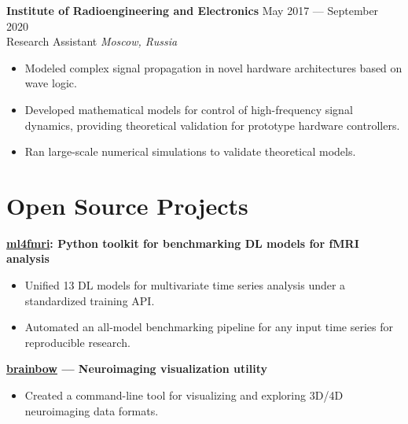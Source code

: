 \documentclass[11pt,a4paper]{article}
\begin{document}
\noindent\textbf{Institute of Radioengineering and Electronics} \hfill May 2017 --- September 2020\\
Research Assistant \hfill \textit{Moscow, Russia}\\
[-2em]
\begin{itemize}[leftmargin=*,noitemsep]
    \item Modeled complex signal propagation in novel hardware architectures based on wave logic.
    \item Developed mathematical models for control of high-frequency signal dynamics, providing theoretical validation for prototype hardware controllers.
    \item Ran large-scale numerical simulations to validate theoretical models.
\end{itemize}

\section*{Open Source Projects}
\noindent\textbf{\href{https://pypi.org/project/ml4fmri/}{ml4fmri}: Python toolkit for benchmarking DL models for fMRI analysis}\\
[-2em]
\begin{itemize}[leftmargin=*,noitemsep]
    \item Unified 13 DL models for multivariate time series analysis under a standardized training API.
    \item Automated an all-model benchmarking pipeline for any input time series for reproducible research.
\end{itemize}

\noindent\textbf{\href{https://pypi.org/project/brainbow/}{brainbow} --- Neuroimaging visualization utility}\\
[-2em]
\begin{itemize}[leftmargin=*,noitemsep]
    \item Created a command-line tool for visualizing and exploring 3D/4D neuroimaging data formats.
\end{itemize}
\end{document}
